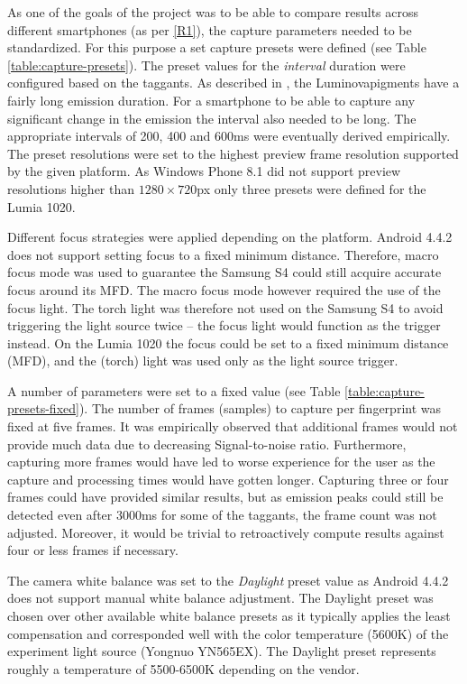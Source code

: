 \documentclass[thesis.tex]{subfiles}
\begin{document}
As one of the goals of the project was to be able to compare results across different smartphones (as per \ref{R1}), the capture parameters needed to be standardized. For this purpose a set capture presets were defined (see Table \ref{table:capture-presets}). The preset values for the \emph{interval} duration were configured based on the taggants. As described in \cite{luminova}, the Luminova\textregistered pigments have a fairly long emission duration. For a smartphone to be able to capture any significant change in the emission the interval also needed to be long. The appropriate intervals of 200, 400 and 600ms were eventually derived empirically. The preset resolutions were set to the highest preview frame resolution supported by the given platform. As Windows Phone 8.1 did not support preview resolutions higher than $1280\times720$px only three presets were defined for the Lumia 1020.

Different focus strategies were applied depending on the platform. Android 4.4.2 does not support setting focus to a fixed minimum distance. Therefore, macro focus mode was used to guarantee the Samsung S4 could still acquire accurate focus around its MFD. The macro focus mode however required the use of the focus light. The torch light was therefore not used on the Samsung S4 to avoid triggering the light source twice -- the focus light would function as the trigger instead. On the Lumia 1020 the focus could be set to a fixed minimum distance (MFD), and the (torch) light was used only as the light source trigger.

A number of parameters were set to a fixed value (see Table \ref{table:capture-presets-fixed}). The number of frames (samples) to capture per fingerprint was fixed at five frames. It was empirically observed that additional frames would not provide much data due to decreasing Signal-to-noise ratio. Furthermore, capturing more frames would have led to worse experience for the user as the capture and processing times would have gotten longer. Capturing three or four frames could have provided similar results, but as emission peaks could still be detected even after 3000ms for some of the taggants, the frame count was not adjusted. Moreover, it would be trivial to retroactively compute results against four or less frames if necessary.

The camera white balance was set to the \emph{Daylight} preset value as Android 4.4.2 does not support manual white balance adjustment. The Daylight preset was chosen over other available white balance presets as it typically applies the least compensation and corresponded well with the color temperature (5600K) of the experiment light source (Yongnuo YN565EX). The Daylight preset represents roughly a temperature of 5500-6500K depending on the vendor.
\end{document}
